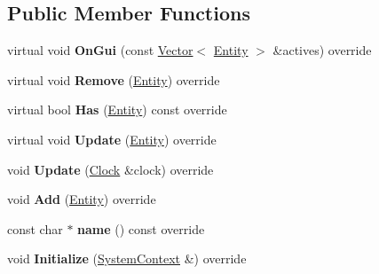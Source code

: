 \subsection*{Public Member Functions}
\begin{DoxyCompactItemize}
\item 
\mbox{\label{classnabla_1_1_assets_system_a3109367ead96a599657894acf324c03a}} 
virtual void {\bfseries On\+Gui} (const \mbox{\hyperlink{classnabla_1_1_s_t_l_vector_ex}{Vector}}$<$ \mbox{\hyperlink{structnabla_1_1_entity}{Entity}} $>$ \&actives) override
\item 
\mbox{\label{classnabla_1_1_assets_system_a58541074e7a8371fcb87cf1abe7f5191}} 
virtual void {\bfseries Remove} (\mbox{\hyperlink{structnabla_1_1_entity}{Entity}}) override
\item 
\mbox{\label{classnabla_1_1_assets_system_abaad7b8e1575668014ca0c8da0687b9a}} 
virtual bool {\bfseries Has} (\mbox{\hyperlink{structnabla_1_1_entity}{Entity}}) const override
\item 
\mbox{\label{classnabla_1_1_assets_system_a9338535326dcc1c5cb6328c9f46e997f}} 
virtual void {\bfseries Update} (\mbox{\hyperlink{structnabla_1_1_entity}{Entity}}) override
\item 
\mbox{\label{classnabla_1_1_assets_system_a3be9450a8c7036e60a263054fe756281}} 
void {\bfseries Update} (\mbox{\hyperlink{classnabla_1_1_clock}{Clock}} \&clock) override
\item 
\mbox{\label{classnabla_1_1_assets_system_a1d0c1d8bfa24949c2e413f285fe4f3d0}} 
void {\bfseries Add} (\mbox{\hyperlink{structnabla_1_1_entity}{Entity}}) override
\item 
\mbox{\label{classnabla_1_1_assets_system_a55b0d8bb241d16810446783cbb3230b7}} 
const char $\ast$ {\bfseries name} () const override
\item 
\mbox{\label{classnabla_1_1_assets_system_aba750488b638dce0c75b1fa6e214ca4f}} 
void {\bfseries Initialize} (\mbox{\hyperlink{structnabla_1_1_system_context}{System\+Context}} \&) override
\end{DoxyCompactItemize}


